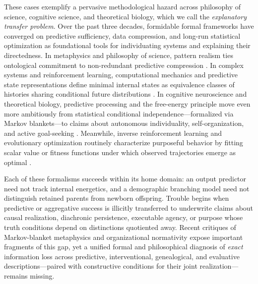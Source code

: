 \documentclass[11pt,a4paper]{article}
\begin{document}
These cases exemplify a pervasive methodological hazard across
philosophy of science, cognitive science, and theoretical biology, which
we call the \emph{explanatory transfer problem}. Over the past three
decades, formidable formal frameworks have converged on predictive
sufficiency, data compression, and long-run statistical optimization as
foundational tools for individuating systems and explaining their
directedness. In metaphysics and philosophy of science, pattern realism
ties ontological commitment to non-redundant predictive compression
\citep{dennett1987, dennett1991, ladymanRoss2007, wimsatt2007}. In
complex systems and reinforcement learning, computational mechanics and
predictive state representations define minimal internal states as
equivalence classes of histories sharing conditional future
distributions
\citep{crutchfieldYoung1989, shaliziCrutchfield2001, littmanSuttonSingh2001, barnettCrutchfield2015}.
In cognitive neuroscience and theoretical biology, predictive processing
and the free-energy principle move even more ambitiously from
statistical conditional independence---formalized via Markov
blankets---to claims about autonomous individuality, self-organization,
and active goal-seeking
\citep{friston2010, friston2013, clark2013, parrPezzuloFriston2022}.
Meanwhile, inverse reinforcement learning and evolutionary optimization
routinely characterize purposeful behavior by fitting scalar value or
fitness functions under which observed trajectories emerge as optimal
\citep{puterman1994, ngRussell2000}.

Each of these formalisms succeeds within its home domain: an output
predictor need not track internal energetics, and a demographic
branching model need not distinguish retained parents from newborn
offspring. Trouble begins when predictive or aggregative success is
illicitly transferred to underwrite claims about causal realization,
diachronic persistence, executable agency, or purpose whose truth
conditions depend on distinctions quotiented away. Recent critiques of
Markov-blanket metaphysics \citep{raja2021, bruineberg2022} and
organizational normativity \citep{corti2023, bich2024, cuciniello2026}
expose important fragments of this gap, yet a unified formal and
philosophical diagnosis of \emph{exact} information loss across
predictive, interventional, genealogical, and evaluative
descriptions---paired with constructive conditions for their joint
realization---remains missing.
\end{document}

